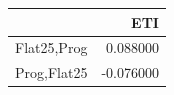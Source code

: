 \begin{tabular}{lr}
\toprule
 & ETI \\
\midrule
Flat25,Prog & 0.088000 \\
Prog,Flat25 & -0.076000 \\
\bottomrule
\end{tabular}
